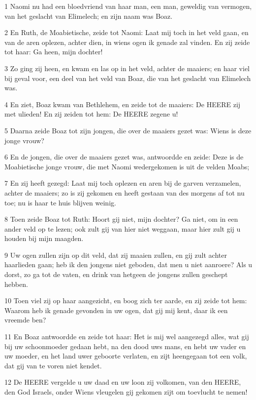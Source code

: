 \par 1 Naomi nu had een bloedvriend van haar man, een man, geweldig van vermogen, van het geslacht van Elimelech; en zijn naam was Boaz.
\par 2 En Ruth, de Moabietische, zeide tot Naomi: Laat mij toch in het veld gaan, en van de aren oplezen, achter dien, in wiens ogen ik genade zal vinden. En zij zeide tot haar: Ga heen, mijn dochter!
\par 3 Zo ging zij heen, en kwam en las op in het veld, achter de maaiers; en haar viel bij geval voor, een deel van het veld van Boaz, die van het geslacht van Elimelech was.
\par 4 En ziet, Boaz kwam van Bethlehem, en zeide tot de maaiers: De HEERE zij met ulieden! En zij zeiden tot hem: De HEERE zegene u!
\par 5 Daarna zeide Boaz tot zijn jongen, die over de maaiers gezet was: Wiens is deze jonge vrouw?
\par 6 En de jongen, die over de maaiers gezet was, antwoordde en zeide: Deze is de Moabietische jonge vrouw, die met Naomi wedergekomen is uit de velden Moabs;
\par 7 En zij heeft gezegd: Laat mij toch oplezen en aren bij de garven verzamelen, achter de maaiers; zo is zij gekomen en heeft gestaan van des morgens af tot nu toe; nu is haar te huis blijven weinig.
\par 8 Toen zeide Boaz tot Ruth: Hoort gij niet, mijn dochter? Ga niet, om in een ander veld op te lezen; ook zult gij van hier niet weggaan, maar hier zult gij u houden bij mijn maagden.
\par 9 Uw ogen zullen zijn op dit veld, dat zij maaien zullen, en gij zult achter haarlieden gaan; heb ik den jongens niet geboden, dat men u niet aanroere? Als u dorst, zo ga tot de vaten, en drink van hetgeen de jongens zullen geschept hebben.
\par 10 Toen viel zij op haar aangezicht, en boog zich ter aarde, en zij zeide tot hem: Waarom heb ik genade gevonden in uw ogen, dat gij mij kent, daar ik een vreemde ben?
\par 11 En Boaz antwoordde en zeide tot haar: Het is mij wel aangezegd alles, wat gij bij uw schoonmoeder gedaan hebt, na den dood uws mans, en hebt uw vader en uw moeder, en het land uwer geboorte verlaten, en zijt heengegaan tot een volk, dat gij van te voren niet kendet.
\par 12 De HEERE vergelde u uw daad en uw loon zij volkomen, van den HEERE, den God Israels, onder Wiens vleugelen gij gekomen zijt om toevlucht te nemen!
